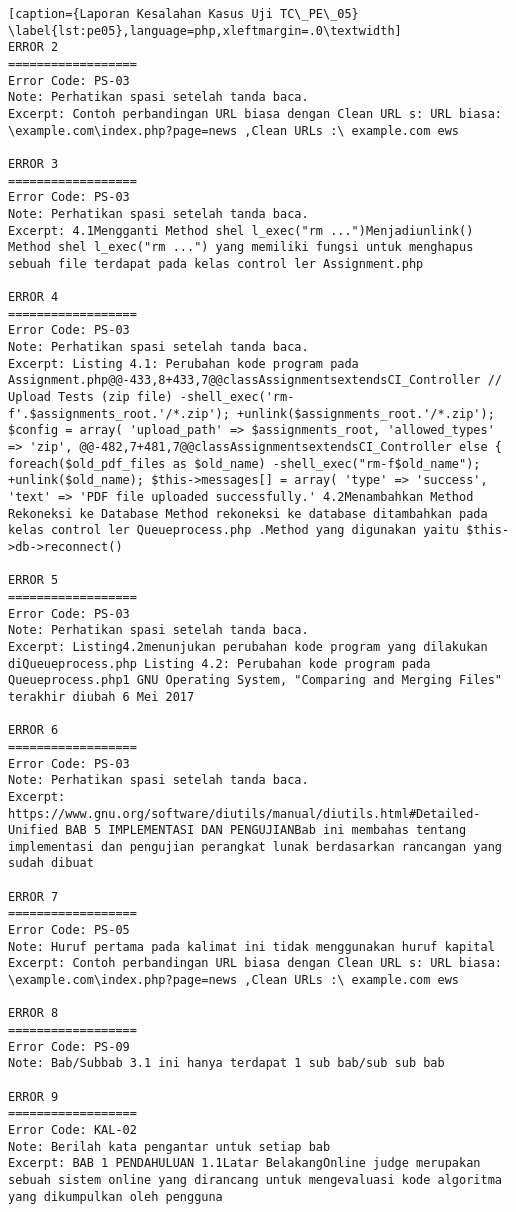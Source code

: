 \begin{enumerate}
\begin{lstlisting}[caption={Laporan Kesalahan Kasus Uji TC\_PE\_05}	\label{lst:pe05},language=php,xleftmargin=.0\textwidth]
ERROR 2
==================
Error Code: PS-03
Note: Perhatikan spasi setelah tanda baca.
Excerpt: Contoh perbandingan URL biasa dengan Clean URL s: URL biasa: \example.com\index.php?page=news ,Clean URLs :\ example.com ews 

ERROR 3
==================
Error Code: PS-03
Note: Perhatikan spasi setelah tanda baca.
Excerpt: 4.1Mengganti Method shel l_exec("rm ...")Menjadiunlink() Method shel l_exec("rm ...") yang memiliki fungsi untuk menghapus sebuah file terdapat pada kelas control ler Assignment.php 

ERROR 4
==================
Error Code: PS-03
Note: Perhatikan spasi setelah tanda baca.
Excerpt: Listing 4.1: Perubahan kode program pada Assignment.php@@-433,8+433,7@@classAssignmentsextendsCI_Controller // Upload Tests (zip file) -shell_exec('rm-f'.$assignments_root.'/*.zip'); +unlink($assignments_root.'/*.zip'); $config = array( 'upload_path' => $assignments_root, 'allowed_types' => 'zip', @@-482,7+481,7@@classAssignmentsextendsCI_Controller else { foreach($old_pdf_files as $old_name) -shell_exec("rm-f$old_name"); +unlink($old_name); $this->messages[] = array( 'type' => 'success', 'text' => 'PDF file uploaded successfully.' 4.2Menambahkan Method Rekoneksi ke Database Method rekoneksi ke database ditambahkan pada kelas control ler Queueprocess.php .Method yang digunakan yaitu $this->db->reconnect() 

ERROR 5
==================
Error Code: PS-03
Note: Perhatikan spasi setelah tanda baca.
Excerpt: Listing4.2menunjukan perubahan kode program yang dilakukan diQueueprocess.php Listing 4.2: Perubahan kode program pada Queueprocess.php1 GNU Operating System, "Comparing and Merging Files" terakhir diubah 6 Mei 2017

ERROR 6
==================
Error Code: PS-03
Note: Perhatikan spasi setelah tanda baca.
Excerpt: https://www.gnu.org/software/diutils/manual/diutils.html#Detailed-Unified BAB 5 IMPLEMENTASI DAN PENGUJIANBab ini membahas tentang implementasi dan pengujian perangkat lunak berdasarkan rancangan yang sudah dibuat

ERROR 7
==================
Error Code: PS-05
Note: Huruf pertama pada kalimat ini tidak menggunakan huruf kapital
Excerpt: Contoh perbandingan URL biasa dengan Clean URL s: URL biasa: \example.com\index.php?page=news ,Clean URLs :\ example.com ews 

ERROR 8
==================
Error Code: PS-09
Note: Bab/Subbab 3.1 ini hanya terdapat 1 sub bab/sub sub bab

ERROR 9
==================
Error Code: KAL-02
Note: Berilah kata pengantar untuk setiap bab
Excerpt: BAB 1 PENDAHULUAN 1.1Latar BelakangOnline judge merupakan sebuah sistem online yang dirancang untuk mengevaluasi kode algoritma yang dikumpulkan oleh pengguna
\end{lstlisting}
	
\end{enumerate}

